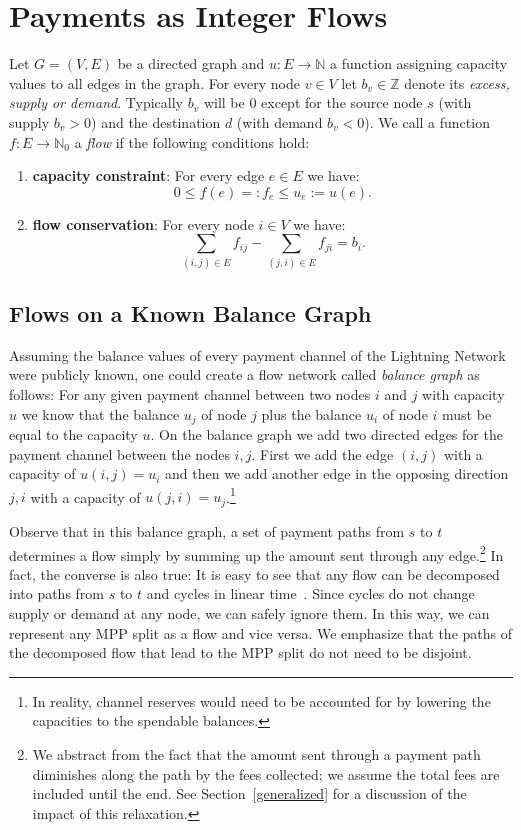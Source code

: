 \documentclass[10pt,twocolumn]{article}
\begin{document}
\section{Payments as Integer Flows}
\label{flows}
Let $G = (V,E)$ be a directed graph and $u: E \longrightarrow \mathbb{N}$ a function assigning capacity values to all edges in the graph.
For every node $v\in V$ let $b_v \in \mathbb{Z}$ denote its \emph{excess, supply or demand}.  Typically $b_v$ will be $0$ except for the source node $s$ (with supply $b_v>0$) and the destination $d$ (with demand $b_v<0$). We call a function $f: E \longrightarrow \mathbb{N}_{0}$ a \emph{flow} if the following conditions hold:
\begin{enumerate}
\item \textbf{capacity constraint}: For every edge $e \in E$ we have: $$0 \leq f(e) =: f_{e} \leq u_{e} := u(e).$$
\item \textbf{flow conservation}: For every node $i\in V$ we have: $$\sum_{(i,j)\in E} f_{ij} - \sum_{(j,i)\in E} f_{ji} = b_i.$$
\end{enumerate}

\subsection{Flows on a Known Balance Graph}
Assuming the balance values of every payment channel of the Lightning Network were publicly known, one could create a flow network called \emph{balance graph} as follows:
For any given payment channel between two nodes $i$ and $j$ with capacity $u$ we know that the balance $u_j$ of node $j$ plus the balance $u_i$ of node $i$ must be equal to the capacity $u$.
On the balance graph we add two directed edges for the payment channel between the nodes $i,j$.
First we add the edge $(i,j)$ with a capacity of $u(i,j) = u_i$ and then we add another edge in the opposing direction $j,i$ with a capacity of $u(j,i)=u_j$.\footnote{In reality, channel reserves would need to be accounted for by lowering the capacities to the spendable balances.}

Observe that in this balance graph, a set of payment paths from $s$ to $t$ determines a flow simply by summing up the amount sent through any edge.\footnote{We abstract from the fact that the amount sent through a payment path diminishes along the path by the fees collected; we assume the total fees are included until the end. See Section~\ref{generalized} for a discussion of the impact of this relaxation.}
In fact, the converse is also true: It is easy to see that any flow can be decomposed into paths from $s$ to $t$ and cycles in linear time~\cite[p.~79ff]{ahuja1993network}.
Since cycles do not change supply or demand at any node, we can safely ignore them.
In this way, we can represent any MPP split as a flow and vice versa.
We emphasize that the paths of the decomposed flow that lead to the MPP split do not need to be disjoint.
\end{document}
